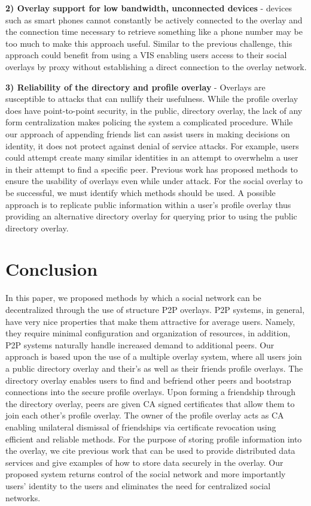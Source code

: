 \documentclass[conference]{IEEEtran}
\begin{document}
{\bf 2) Overlay support for low bandwidth, unconnected devices} - devices such as
smart phones cannot constantly be actively connected to the overlay and the
connection time necessary to retrieve something like a phone number may be
too much to make this approach useful.  Similar to the previous challenge,
this approach could benefit from using a VIS enabling users access to their
social overlays by proxy without establishing a direct connection to the overlay
network.

{\bf 3) Reliability of the directory and profile overlay} - Overlays are
susceptible to attacks that can nullify their usefulness.  While
the profile overlay does have point-to-point security, in the public,
directory overlay, the lack of any form centralization makes policing the system
a complicated procedure.  While our approach of appending friends list can assist
users in making decisions on identity, it does not protect against denial of
service attacks.  For example, users could attempt create many similar identities
in an attempt to overwhelm a user in their attempt to find a specific peer.
Previous work has proposed methods to ensure the usability of overlays even
while under attack.  For the social overlay to be successful, we must identify
which methods should be used. A possible approach is to replicate public
information within a user's profile overlay thus providing an alternative
directory overlay for querying prior to using the public directory overlay.

\section{Conclusion}
\label{conclusion}
In this paper, we proposed methods by which a social network can be
decentralized through the use of structure P2P overlays.  P2P systems, in
general, have very nice properties that make them attractive for average users.
Namely, they require minimal configuration and organization of resources, in
addition, P2P systems naturally handle increased demand to additional peers.
Our approach is based upon the use of a multiple overlay system, where all users
join a public directory overlay and their's as well as their friends profile
overlays.  The directory overlay enables users to find and befriend other peers
and bootstrap connections into the secure profile overlays.  Upon forming a
friendship through the directory overlay, peers are given CA signed certificates
that allow them to join each other's profile overlay.  The owner of the profile
overlay acts as CA enabling unilateral dismissal of friendships via certificate
revocation using efficient and reliable methods.  For the purpose of storing
profile information into the overlay, we cite previous work that can be used to
provide distributed data services and give examples of how to store data
securely in the overlay.  Our proposed system returns control of the social
network and more importantly users' identity to the users and eliminates the
need for centralized social networks.

\small{


}
\end{document}

